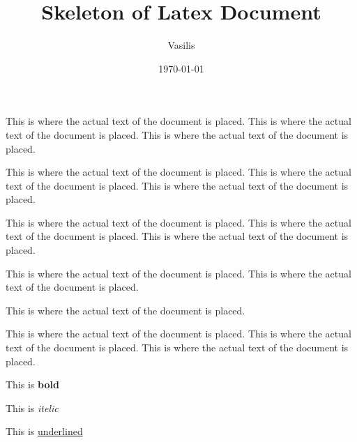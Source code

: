 \documentclass{article}
\title{Skeleton of Latex Document}
\author{Vasilis}
\date{\today}
\begin{document}
\maketitle

This is where the actual text of the document is placed. This is where the actual text of the document is placed. This is where the actual text of the document is placed. 

This is where the actual text of the document is placed. This is where the actual text of the document is placed. This is where the actual text of the document is placed. 

This is where the actual text of the document is placed. This is where the actual text of the document is placed. This is where the actual text of the document is placed. 

This is where the actual text of the document is placed. This is where the actual text of the document is placed. \par This is where the actual text of the document is placed. 

This is where the actual text of the document is placed. This is where the actual text of the document is placed. \newline This is where the actual text of the document is placed. 

This is \textbf{bold}

This is \textit{itelic}

This is \underline{underlined}
\end{document}
